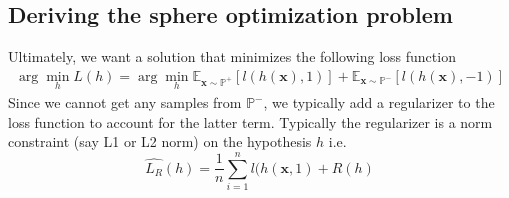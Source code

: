 \documentclass[11pt]{report}
\begin{document}
\subsection{Deriving the sphere optimization problem}
Ultimately, we want a solution that minimizes the following loss function
\begin{align}
    \arg\!\min_h L(h) 
    = \arg\!\min_h \mathbb{E}_{\boldsymbol{x} \sim \mathbb{P}^+} \left[ l(h(\boldsymbol{x}), 1) \right] + \mathbb{E}_{\boldsymbol{x} \sim \mathbb{P}^-} \left[ l(h(\boldsymbol{x}), -1) \right]
\end{align}
Since we cannot get any samples from $\mathbb{P^-}$, we typically add a regularizer to the loss function to account for the latter term. Typically the regularizer is a norm constraint (say L1 or L2 norm) on the hypothesis $h$ i.e.
$$\hat{L_R}(h) = \frac{1}{n}\sum _{i=1} ^n l(h(\boldsymbol{x}, 1) + R(h)$$
\end{document}
